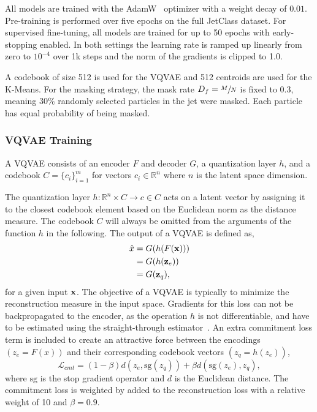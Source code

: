 All models are trained with the AdamW~\cite{AdamW} optimizer with a weight decay of $0.01$.
Pre-training is performed over five epochs on the full JetClass dataset.
For supervised fine-tuning, all models are trained for up to 50 epochs with early-stopping enabled.
In both settings the learning rate is ramped up linearly from zero to $10^{-4}$ over 1k steps and the norm of the gradients is clipped to 1.0.

A codebook of size 512 is used for the VQVAE and 512 centroids are used for the K-Means.
For the masking strategy, the mask rate $D_f=\sfrac{M}{N}$ is fixed to 0.3, meaning 30\% randomly selected particles in the jet were masked.
Each particle has equal probability of being masked.

\subsubsection{VQVAE Training}

A VQVAE consists of an encoder $F$ and decoder $G$, a quantization layer $h$, and a codebook ${C}=\{c_i\}_{i=1}^m$ for vectors $c_i \in \mathbb{R}^n$ where $n$ is the latent space dimension.

The quantization layer $h: \mathbb{R}^n \times {C} \rightarrow c \in {C}$ acts on a latent vector by assigning it to the closest codebook element based on the Euclidean norm as the distance measure.
The codebook $C$ will always be omitted from the arguments of the function $h$ in the following.
The output of a VQVAE is defined as,
\begin{align}
    \hat{x} & = G(h(F(\mathbf{x}))) \\
            & = G(h(\mathbf{z}_e))  \\
            & = G(\mathbf{z}_q),
\end{align}
for a given input $\mathbf{x}$.
The objective of a VQVAE is typically to minimize the reconstruction measure in the input space.
Gradients for this loss can not be backpropagated to the encoder, as the operation $h$ is not differentiable, and have to be estimated using the straight-through estimator~\cite{StraightThrough}.
An extra commitment loss term is included to create an attractive force between the encodings $(z_e=F(x))$ and their corresponding codebook vectors $(z_q = h(z_e))$,
\begin{equation}
    \mathcal{L}_{cmt} = (1-\beta)d(z_e,\mathrm{sg}(z_q)) + \beta d(\mathrm{sg}(z_e),z_q),
\end{equation}
where $\mathrm{sg}$ is the stop gradient operator and $d$ is the Euclidean distance.
The commitment loss is weighted by added to the reconstruction loss with a relative weight of 10 and $\beta=0.9$.


